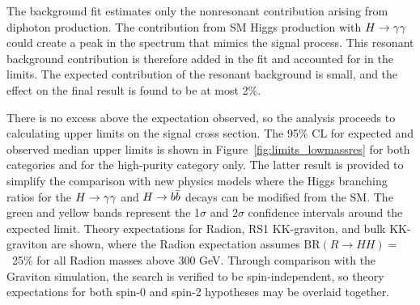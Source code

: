 The background fit estimates only the nonresonant contribution arising from diphoton
production. The contribution from SM Higgs production with $H\to\gamma\gamma$ could create a peak in the
spectrum that mimics the signal process. This resonant background
contribution is therefore added in the fit and accounted for in the limits.
The expected contribution of the resonant background is small, and the
effect on the final result is found to be at most 2\%.

There is no excess above the expectation observed, so the analysis proceeds to calculating
upper limits on the signal cross section.
The 95\% CL for expected and observed median upper limits is shown in
Figure~\ref{fig:limits_lowmassres} for both categories and for the high-purity category only.
The latter result is provided to simplify the comparison with new physics models where
the Higgs branching ratios for the $H\to\gamma\gamma$ and $H\to b\bar{b}$ decays can be modified from the SM.
The green and yellow bands represent the 1$\sigma$ and 2$\sigma$
confidence intervals around the expected limit. Theory expectations for Radion, RS1 KK-graviton, and 
bulk KK-graviton are shown, where the Radion expectation assumes $\text{BR}(R\rightarrow HH) =$~25\%
for all Radion masses above 300 GeV. Through comparison with the Graviton simulation,
the search is verified to be spin-independent, so theory expectations for both spin-0 and spin-2
hypotheses may be overlaid together.


